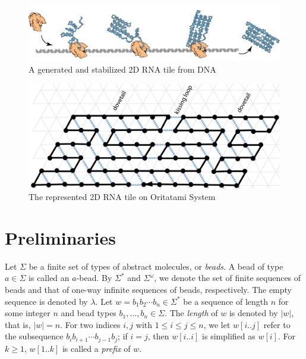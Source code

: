 \documentclass[runningheads]{llncs}
\begin{document}
\begin{figure}[tb]
\centering
\includegraphics[width=\linewidth]{fig/rna_origami.pdf}
\caption{
A generated and stabilized 2D RNA tile from DNA
}
\label{fig:rna_origami}
\end{figure}

\begin{figure}[tb]
\centering
\includegraphics[width=\linewidth]{fig/origami_oritatami.pdf}
\caption{
The represented 2D RNA tile on Oritatami System
}
\label{fig:origami_on_oritatami}
\end{figure}



	\section{Preliminaries}


Let $\Sigma$ be a finite set of types of abstract molecules, or \textit{beads}. 
A bead of type $a \in \Sigma$ is called an $a$-bead. 
By $\Sigma^*$ and $\Sigma^\omega$, we denote the set of finite sequences of beads and that of one-way infinite sequences of beads, respectively. 
The empty sequence is denoted by $\lambda$. 
Let $w = b_1 b_2 \cdots b_n \in \Sigma^*$ be a sequence of length $n$ for some integer $n$ and bead types $b_1, \ldots, b_n \in \Sigma$. 
The \textit{length} of $w$ is denoted by $|w|$, that is, $|w| = n$. %
For two indices $i, j$ with $1 \le i \le j \le n$, we let $w[i..j]$ refer to the subsequence $b_i b_{i+1} \cdots b_{j-1}b_j$; if $i = j$, then $w[i..i]$ is simplified as $w[i]$. 
For $k \ge 1$, $w[1..k]$ is called a \textit{prefix} of $w$. 
\end{document}
